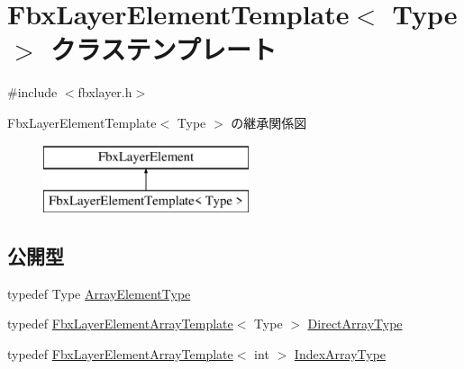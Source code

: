 \hypertarget{class_fbx_layer_element_template}{}\section{Fbx\+Layer\+Element\+Template$<$ Type $>$ クラステンプレート}
\label{class_fbx_layer_element_template}


{\ttfamily \#include $<$fbxlayer.\+h$>$}

Fbx\+Layer\+Element\+Template$<$ Type $>$ の継承関係図\begin{figure}[H]
\begin{center}
\leavevmode
\includegraphics[height=2.000000cm]{class_fbx_layer_element_template}
\end{center}
\end{figure}
\subsection*{公開型}
\begin{DoxyCompactItemize}
\item 
typedef Type \hyperlink{class_fbx_layer_element_template_a24cfd1d513a54140bde996ccfa2bf2b6}{Array\+Element\+Type}
\item 
typedef \hyperlink{class_fbx_layer_element_array_template}{Fbx\+Layer\+Element\+Array\+Template}$<$ Type $>$ \hyperlink{class_fbx_layer_element_template_a1adf77aa24da5ff9786bb19286dcac13}{Direct\+Array\+Type}
\item 
typedef \hyperlink{class_fbx_layer_element_array_template}{Fbx\+Layer\+Element\+Array\+Template}$<$ int $>$ \hyperlink{class_fbx_layer_element_template_ada80e444d13e2a73cb90551a712a58ed}{Index\+Array\+Type}
\end{DoxyCompactItemize}
